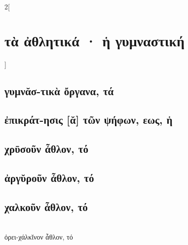\documentclass{book}
\begin{document}
\begin{multicols}{2}[\section{τὰ ἀθλητικά · ἡ γυμναστική}]
\subsection{γυμνᾰσ-τικὰ ὄργανα, τά}
\subsection{ἐπικράτ-ησις [ᾰ] τῶν ψήφων, εως, ἡ}
\subsection{χρῡσοῦν ἆθλον, τό}
\subsection{ἀργῠροῦν ἆθλον, τό}
\subsection{χαλκοῦν ἆθλον, τό}
 ~\\
ὀρει-χάλκῐνον ἆθλον, τό
~
\end{multicols}
\newpage 
\end{document}
